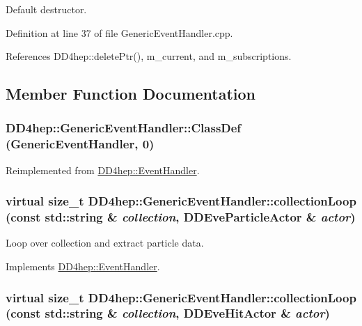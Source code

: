 Default destructor. 

Definition at line 37 of file GenericEventHandler.cpp.

References DD4hep::deletePtr(), m\_\-current, and m\_\-subscriptions.

\subsection{Member Function Documentation}
\hypertarget{class_d_d4hep_1_1_generic_event_handler_abbb82b5fc62720e45ed6c2ff03ae526d}{
\subsubsection[{ClassDef}]{\setlength{\rightskip}{0pt plus 5cm}DD4hep::GenericEventHandler::ClassDef ({\bf GenericEventHandler}, \/  0)}}
\label{class_d_d4hep_1_1_generic_event_handler_abbb82b5fc62720e45ed6c2ff03ae526d}


Reimplemented from \hyperlink{class_d_d4hep_1_1_event_handler_a44c310a4296693f09e62adbac3fbe2c6}{DD4hep::EventHandler}.\hypertarget{class_d_d4hep_1_1_generic_event_handler_a401b32a86d996b71baa133c4f4b00709}{
\subsubsection[{collectionLoop}]{\setlength{\rightskip}{0pt plus 5cm}virtual size\_\-t DD4hep::GenericEventHandler::collectionLoop (const std::string \& {\em collection}, \/  {\bf DDEveParticleActor} \& {\em actor})}}
\label{class_d_d4hep_1_1_generic_event_handler_a401b32a86d996b71baa133c4f4b00709}


Loop over collection and extract particle data. 

Implements \hyperlink{class_d_d4hep_1_1_event_handler_ae43595c2760736a7ca628183a2c91ec2}{DD4hep::EventHandler}.\hypertarget{class_d_d4hep_1_1_generic_event_handler_ad521db17296b0abb05294f61f83b2019}{
\subsubsection[{collectionLoop}]{\setlength{\rightskip}{0pt plus 5cm}virtual size\_\-t DD4hep::GenericEventHandler::collectionLoop (const std::string \& {\em collection}, \/  {\bf DDEveHitActor} \& {\em actor})}}
\label{class_d_d4hep_1_1_generic_event_handler_ad521db17296b0abb05294f61f83b2019}


